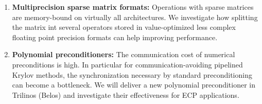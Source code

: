 \begin{enumerate}
	\item \textbf{Multiprecision sparse matrix formats:} Operations with sparse 
	matrices are memory-bound on virtually all architectures. We investigate 
	how splitting the matrix int several operators stored in value-optimized 
	less complex floating point precision formats can help improving
	performance.
	\item \textbf{Polynomial preconditioners:} The communication cost of 
	numerical preconditions is high. In particular for communication-avoiding 
	pipelined Krylov methods, the synchronization necessary by standard 
	preconditioning can become a bottleneck. We will deliver a new
        polynomial preconditioner in Trilinos (Belos) and investigate their effectiveness 
	for ECP applications.
\end{enumerate}
